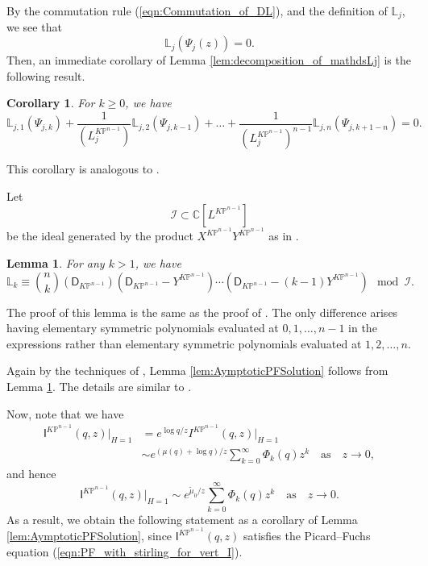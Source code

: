 \documentclass[12pt]{amsart}
\newtheorem{lem}[prop]{Lemma}
\newtheorem{cor}[prop]{Corollary}
\numberwithin{equation}{section}
\newcommand{\KP}{K\mathbb{P}}
\begin{document}
By the commutation rule (\ref{eqn:Commutation_of_DL}), and the definition of $\mathds{L}_j$, we see that
\begin{equation*}
\mathds{L}_j(\Psi_j(z))=0.
\end{equation*}
Then, an immediate corollary of Lemma \ref{lem:decomposition_of_mathdsLj} is the following result.
\begin{cor}\label{cor:LjkPsiEquation}
For $k\geq 0$, we have
\begin{equation}\label{eqn:Corollary_Eqn_of_General_Polynomiality}
\mathds{L}_{j,1}(\Psi_{j,k})
+\frac{1}{(L_j^{K\mathbb{P}^{n-1}})}\mathds{L}_{j,2}(\Psi_{j,k-1})
+\ldots
+\frac{1}{(L_j^{K\mathbb{P}^{n-1}})^{n-1}}\mathds{L}_{j,n}(\Psi_{j,k+1-n})=0.
\end{equation}
\end{cor}
This corollary is analogous to \cite[Theorem 4.i]{zz}.

Let $$\mathcal{I}\subset\mathbb{C}\left[L^{\KP^{n-1}}\right]$$ be the ideal generated by the product $X^{\KP^{n-1}}Y^{\KP^{n-1}}$ as in \cite{zz}. 
\begin{lem}\label{lem:mathdsLk_modI}
For any $k>1$, we have
\begin{equation*}
\mathds{L}_{k}\equiv\binom{n}{k}(\mathsf{D}_{\KP^{n-1}})(\mathsf{D}_{\KP^{n-1}}-Y^{\KP^{n-1}})\cdots(\mathsf{D}_{\KP^{n-1}}-(k-1)Y^{\KP^{n-1}})\mod\mathcal{I}.
\end{equation*}
\end{lem}
The proof of this lemma is the same as the proof of \cite[Lemma 4]{zz}. The only difference arises having elementary symmetric polynomials evaluated at $0,1,\ldots,n-1$ in the expressions rather than elementary symmetric polynomials evaluated at $1,2,\ldots,n$. 

Again by the techniques of \cite{zz}, Lemma \ref{lem:AymptoticPFSolution} follows from Lemma \ref{lem:mathdsLk_modI}. The details are similar to \cite[Appendix B]{gt}.


Now, note that we have
\begin{align*}
 \mathsf{I}^{\KP^{n-1}}(q,z)\big\vert_{H=1}
 &=e^{\log q/z}I^{\KP^{n-1}}(q,z)\big\vert_{H=1}\\
&\sim e^{(\mu(q)+\log q)/z}\sum_{k=0}^{\infty} \Phi_{k}(q) {z}^k \quad \text{as} \quad {z} \rightarrow 0,
\end{align*}
and hence
\begin{equation*}
 \mathsf{I}^{\KP^{n-1}}(q,z)\big\vert_{H=1} \sim e^{\widetilde{\mu}_0/z}\sum_{k=0}^{\infty} \Phi_{k}(q) {z}^k \quad \text{as} \quad {z} \rightarrow 0. 
\end{equation*}
As a result, we obtain the following statement as a corollary of Lemma \ref{lem:AymptoticPFSolution}, since $\mathsf{I}^{\KP^{n-1}}(q,z)$ satisfies the Picard--Fuchs equation (\ref{eqn:PF_with_stirling_for_vert_I}).
\end{document}
